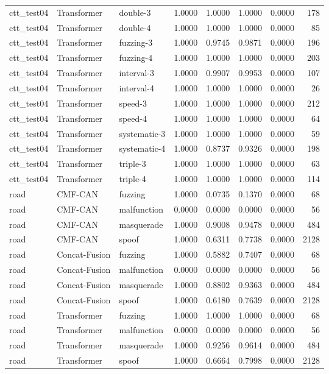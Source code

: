 \begin{tabular}{lllrrrrr}
ctt\_test04 & Transformer & double-3 & 1.0000 & 1.0000 & 1.0000 & 0.0000 & 178 \\
ctt\_test04 & Transformer & double-4 & 1.0000 & 1.0000 & 1.0000 & 0.0000 & 85 \\
ctt\_test04 & Transformer & fuzzing-3 & 1.0000 & 0.9745 & 0.9871 & 0.0000 & 196 \\
ctt\_test04 & Transformer & fuzzing-4 & 1.0000 & 1.0000 & 1.0000 & 0.0000 & 203 \\
ctt\_test04 & Transformer & interval-3 & 1.0000 & 0.9907 & 0.9953 & 0.0000 & 107 \\
ctt\_test04 & Transformer & interval-4 & 1.0000 & 1.0000 & 1.0000 & 0.0000 & 26 \\
ctt\_test04 & Transformer & speed-3 & 1.0000 & 1.0000 & 1.0000 & 0.0000 & 212 \\
ctt\_test04 & Transformer & speed-4 & 1.0000 & 1.0000 & 1.0000 & 0.0000 & 64 \\
ctt\_test04 & Transformer & systematic-3 & 1.0000 & 1.0000 & 1.0000 & 0.0000 & 59 \\
ctt\_test04 & Transformer & systematic-4 & 1.0000 & 0.8737 & 0.9326 & 0.0000 & 198 \\
ctt\_test04 & Transformer & triple-3 & 1.0000 & 1.0000 & 1.0000 & 0.0000 & 63 \\
ctt\_test04 & Transformer & triple-4 & 1.0000 & 1.0000 & 1.0000 & 0.0000 & 114 \\
road & CMF-CAN & fuzzing & 1.0000 & 0.0735 & 0.1370 & 0.0000 & 68 \\
road & CMF-CAN & malfunction & 0.0000 & 0.0000 & 0.0000 & 0.0000 & 56 \\
road & CMF-CAN & masquerade & 1.0000 & 0.9008 & 0.9478 & 0.0000 & 484 \\
road & CMF-CAN & spoof & 1.0000 & 0.6311 & 0.7738 & 0.0000 & 2128 \\
road & Concat-Fusion & fuzzing & 1.0000 & 0.5882 & 0.7407 & 0.0000 & 68 \\
road & Concat-Fusion & malfunction & 0.0000 & 0.0000 & 0.0000 & 0.0000 & 56 \\
road & Concat-Fusion & masquerade & 1.0000 & 0.8802 & 0.9363 & 0.0000 & 484 \\
road & Concat-Fusion & spoof & 1.0000 & 0.6180 & 0.7639 & 0.0000 & 2128 \\
road & Transformer & fuzzing & 1.0000 & 1.0000 & 1.0000 & 0.0000 & 68 \\
road & Transformer & malfunction & 0.0000 & 0.0000 & 0.0000 & 0.0000 & 56 \\
road & Transformer & masquerade & 1.0000 & 0.9256 & 0.9614 & 0.0000 & 484 \\
road & Transformer & spoof & 1.0000 & 0.6664 & 0.7998 & 0.0000 & 2128 \\
\bottomrule
\end{tabular}
